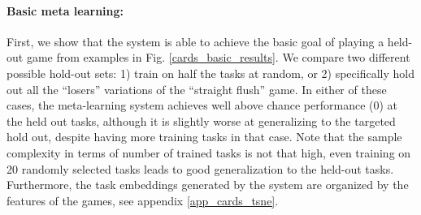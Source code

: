 \documentclass{article}
\begin{document}
\paragraph{Basic meta learning:} First, we show that the system is able to achieve the basic goal of playing a held-out game from examples in Fig. \ref{cards_basic_results}. We compare two different possible hold-out sets: 1) train on half the tasks at random, or 2) specifically hold out all the ``losers'' variations of the ``straight flush'' game. In either of these cases, the meta-learning system achieves well above chance performance (0) at the held out tasks, although it is slightly worse at generalizing to the targeted hold out, despite having more training tasks in that case. Note that the sample complexity in terms of number of trained tasks is not that high, even training on 20 randomly selected tasks leads to good generalization to the held-out tasks. Furthermore, the task embeddings generated by the system are organized by the features of the games, see appendix \ref{app_cards_tsne}. \par
\vspace{-0.7em}
\end{document}
